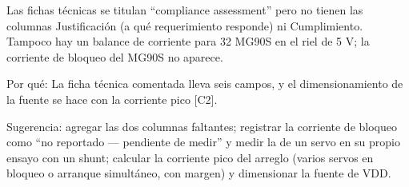 \documentclass{LabDSTresponse}
\begin{document}
{Las fichas técnicas se titulan “compliance assessment” pero no tienen las columnas Justificación (a qué requerimiento responde) ni Cumplimiento. Tampoco hay un balance de corriente para 32 MG90S en el riel de 5 V; la corriente de bloqueo del MG90S no aparece.

Por qué: La ficha técnica comentada lleva seis campos, y el dimensionamiento de la fuente se hace con la corriente pico [C2].

Sugerencia: agregar las dos columnas faltantes; registrar la corriente de bloqueo como “no reportado — pendiente de medir” y medir la de un servo en su propio ensayo con un shunt; calcular la corriente pico del arreglo (varios servos en bloqueo o arranque simultáneo, con margen) y dimensionar la fuente de VDD.}
\end{document}
